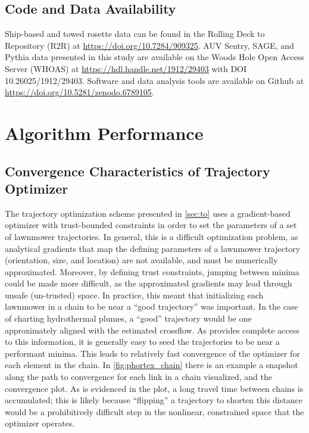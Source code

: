 \section{Code and Data Availability}
Ship-based and towed rosette data can be found in the Rolling Deck to Repository (R2R) at \url{https://doi.org/10.7284/909325}. AUV Sentry, SAGE, and Pythia data presented in this study are available on the Woods Hole Open Access Server (WHOAS) at \url{https://hdl.handle.net/1912/29403} with DOI 10.26025/1912/29403. Software and data analysis tools are available on Github at \url{https://doi.org/10.5281/zenodo.6789105}.

\chapter{\PHORTEX Algorithm Performance}
\label{app:phortex}

\section{Convergence Characteristics of Trajectory Optimizer}
The trajectory optimization scheme presented in \cref{sec:to} uses a gradient-based optimizer with trust-bounded constraints in order to set the parameters of a set of lawnmower trajectories. In general, this is a difficult optimization problem, as analytical gradients that map the defining parameters of a lawnmower trajectory (orientation, size, and location) are not available, and must be numerically approximated. Moreover, by defining trust constraints, jumping between minima could be made more difficult, as the approximated gradients may lead through unsafe (un-trusted) space. In practice, this meant that initializing each lawnmower in a chain to be near a ``good trajectory'' was important. In the case of charting hydrothermal plumes, a ``good'' trajectory would be one approximately aligned with the estimated crossflow. As \PHUMES provides complete access to this information, it is generally easy to seed the trajectories to be near a performant minima. This leads to relatively fast convergence of the optimizer for each element in the chain. In \cref{fig:phortex_chain} there is an example a snapshot along the path to convergence for each link in a chain visualized, and the convergence plot. As is evidenced in the plot, a long travel time between chains is accumulated; this is likely because ``flipping'' a trajectory to shorten this distance would be a prohibitively difficult step in the nonlinear, constrained space that the optimizer operates.

